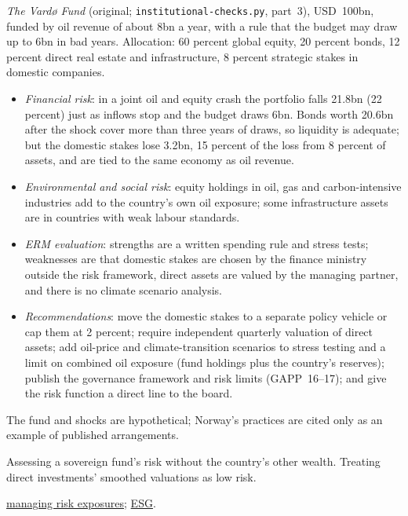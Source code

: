\begin{qfmethod}
 \emph{The Vardø Fund} (original; \texttt{institutional-checks.py}, part~3), USD~100bn, funded by oil revenue of about 8bn a year, with a rule that the budget may draw up to 6bn in bad years. Allocation: 60 percent global equity, 20 percent bonds, 12 percent direct real estate and infrastructure, 8 percent strategic stakes in domestic companies.
\begin{itemize}
\item \emph{Financial risk}: in a joint oil and equity crash the portfolio falls 21.8bn (22 percent) just as inflows stop and the budget draws 6bn. Bonds worth 20.6bn after the shock cover more than three years of draws, so liquidity is adequate; but the domestic stakes lose 3.2bn, 15 percent of the loss from 8 percent of assets, and are tied to the same economy as oil revenue.
\item \emph{Environmental and social risk}: equity holdings in oil, gas and carbon-intensive industries add to the country's own oil exposure; some infrastructure assets are in countries with weak labour standards.
\item \emph{ERM evaluation}: strengths are a written spending rule and stress tests; weaknesses are that domestic stakes are chosen by the finance ministry outside the risk framework, direct assets are valued by the managing partner, and there is no climate scenario analysis.
\item \emph{Recommendations}: move the domestic stakes to a separate policy vehicle or cap them at 2 percent; require independent quarterly valuation of direct assets; add oil-price and climate-transition scenarios to stress testing and a limit on combined oil exposure (fund holdings plus the country's reserves); publish the governance framework and risk limits (GAPP~16--17); and give the risk function a direct line to the board.
\end{itemize}

 The fund and shocks are hypothetical; Norway's practices are cited only as an example of published arrangements.

 Assessing a sovereign fund's risk without the country's other wealth. Treating direct investments' smoothed valuations as low risk.

 \hyperref[meth:risk-identification-modification]{managing risk exposures}; \hyperref[meth:institutional-esg-integration]{ESG}.

\end{qfmethod}

